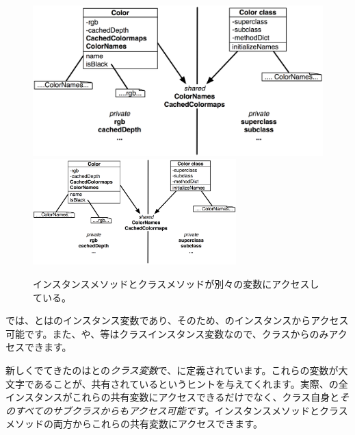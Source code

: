 \documentclass[a4paper,10pt,twoside]{book}
\begin{document}
\begin{figure}[htb]
\begin{center}
\ifluluelse
	{\includegraphics[width=\textwidth]{privateSharedVarColor}}
	{\includegraphics[width=0.7\textwidth]{privateSharedVarColor}}
\caption{インスタンスメソッドとクラスメソッドが別々の変数にアクセスしている。}
\end{center}
\end{figure}

では、とはのインスタンス変数であり、そのため、のインスタンスからアクセス可能です。また、や、等はクラスインスタンス変数なので、クラスからのみアクセスできます。

新しくでてきたのはとの\emph{クラス変数}で、に定義されています。これらの変数が大文字であることが、共有されているというヒントを与えてくれます。実際、の全インスタンスがこれらの共有変数にアクセスできるだけでなく、クラス自身と\emph{そのすべてのサブクラスからもアクセス可能です}。インスタンスメソッドとクラスメソッドの両方からこれらの共有変数にアクセスできます。

\end{document}
